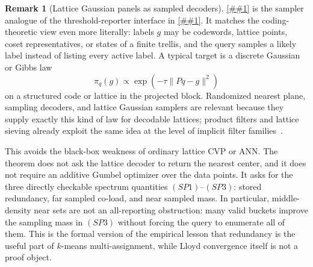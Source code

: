 \documentclass[10pt]{article}
\newcommand{\cref}[1]{\ref{##1}}
\newcommand{\Cref}[1]{\ref{##1}}
\theoremstyle{definition}
\newtheorem{remark}[theorem]{Remark}
\begin{document}
\begin{remark}[Lattice Gaussian panels as sampled decoders]
   \label{rem:lattice-gaussian-panels}
   \Cref{prop:sampled-structured-panel} is the sampler analogue of the
   threshold-reporter interface in
   \cref{lem:soft-list-recovery-reporter}.  It matches the coding-theoretic
   view even more literally: labels \(g\) may be codewords, lattice points,
   coset representatives, or states of a finite trellis, and the query samples
   a likely label instead of listing every active label.  A typical target is a
   discrete Gaussian or Gibbs law
   \[
      \pi_q(g)\propto
      \exp\!\left(-\tau\|Pq-g\|^2\right)
   \]
   on a structured code or lattice in the projected block.  Randomized nearest
   plane, sampling decoders, and lattice Gaussian samplers
   \cite{Kle00,LLS11,GPV08,Pei10} are relevant
   because they supply exactly this kind of law for decodable lattices; product
   filters and lattice sieving already exploit the same idea at the level of
   implicit filter families~\cite{BDGL16,GNR10}.

   This avoids the black-box weakness of ordinary lattice CVP or ANN.  The
   theorem does not ask the lattice decoder to return the nearest center, and
   it does not require an additive Gumbel optimizer over the data points.  It
   asks for the three directly checkable spectrum quantities \((SP1)\)--\((SP3)\):
   stored redundancy, far sampled co-load, and near sampled mass.  In
   particular, middle-density near sets are not an all-reporting obstruction:
   many valid buckets improve the sampling mass in \((SP3)\) without forcing
   the query to enumerate all of them.  This is the formal version of the
   empirical lesson that redundancy is the useful part of \(k\)-means
   multi-assignment, while Lloyd convergence itself is not a proof object.
\end{remark}
\end{document}
